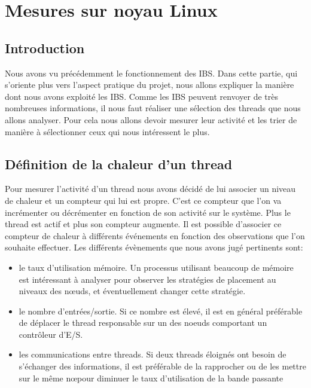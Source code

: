 \chapter{Mesures sur noyau Linux}

  \section{Introduction}

    Nous avons vu précédemment le fonctionnement des IBS. Dans cette partie, qui
    s'oriente plus vers l'aspect pratique du projet, nous allons expliquer la
    manière dont nous avons exploité les IBS. Comme les IBS peuvent renvoyer de
    très nombreuses informations, il nous faut réaliser une sélection des
    threads que nous allons analyser. Pour cela nous allons devoir mesurer leur
    activité et les trier de manière à sélectionner ceux qui nous intéressent le
    plus.

  \section{Définition de la chaleur d'un thread}

    Pour mesurer l'activité d'un thread nous avons décidé de lui associer un
    niveau de chaleur et un compteur qui lui est propre. C'est ce compteur que
    l'on va incrémenter ou décrémenter en fonction de son activité sur le
    système. Plus le thread est actif et plus son compteur augmente. Il est
    possible d'associer ce compteur de chaleur à différents événements en
    fonction des observations que l'on souhaite effectuer. Les différents
    évènements que nous avons jugé pertinents sont:

    \begin{itemize}
      \item le taux d'utilisation mémoire. Un processus utilisant beaucoup de
        mémoire est intéressant à analyser pour observer les stratégies de
        placement au niveaux des n\oe uds, et éventuellement changer cette
        stratégie.
      \item le nombre d'entrées/sortie. Si ce nombre est élevé, il est en
        général préférable de déplacer le thread responsable sur un des noeuds
        comportant un contrôleur d'E/S.
      \item les communications entre threads. Si deux threads éloignés ont
        besoin de s'échanger des informations, il est préférable de la
        rapprocher ou de les mettre sur le même n\oe pour diminuer le taux
        d'utilisation de la bande passante
    \end{itemize}


